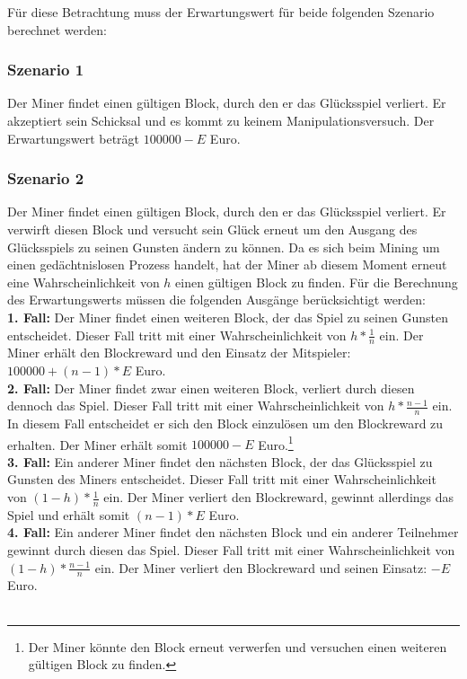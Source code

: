 Für diese Betrachtung muss der Erwartungswert für beide folgenden Szenario berechnet werden:

\subsubsection{Szenario 1} 
Der Miner findet einen gültigen Block, durch den er das Glücksspiel verliert. Er akzeptiert sein Schicksal und es kommt zu keinem Manipulationsversuch. Der Erwartungswert beträgt $100000 - E$ Euro.
\subsubsection{Szenario 2} 
Der Miner findet einen gültigen Block, durch den er das Glücksspiel verliert. Er verwirft diesen Block und versucht sein Glück erneut um den Ausgang des Glücksspiels zu seinen Gunsten ändern zu können. Da es sich beim Mining um einen gedächtnislosen Prozess handelt, hat der Miner ab diesem Moment erneut eine Wahrscheinlichkeit von $h$ einen gültigen Block zu finden. Für die Berechnung des Erwartungswerts müssen die folgenden Ausgänge berücksichtigt werden:\\
\textbf{1. Fall:} Der Miner findet einen weiteren Block, der das Spiel zu seinen Gunsten entscheidet. Dieser Fall tritt mit einer Wahrscheinlichkeit von $h*\frac{1}{n}$ ein. Der Miner erhält den Blockreward und den Einsatz der Mitspieler: $100000 + (n-1)*E$ Euro.\\
\textbf{2. Fall:} Der Miner findet zwar einen weiteren Block, verliert durch diesen dennoch das Spiel. Dieser Fall tritt mit einer Wahrscheinlichkeit von $h*\frac{n-1}{n}$ ein. In diesem Fall entscheidet er sich den Block einzulösen um den Blockreward zu erhalten. Der Miner erhält somit $100000 - E$ Euro.\footnote{Der Miner könnte den Block erneut verwerfen und versuchen einen weiteren gültigen Block zu finden.}\\
\textbf{3. Fall:} Ein anderer Miner findet den nächsten Block, der das Glücksspiel zu Gunsten des Miners entscheidet. Dieser Fall tritt mit einer Wahrscheinlichkeit von $(1-h)*\frac{1}{n}$ ein. Der Miner verliert den Blockreward, gewinnt allerdings das Spiel und erhält somit $(n-1)*E$ Euro.\\
\textbf{4. Fall:} Ein anderer Miner findet den nächsten Block und ein anderer Teilnehmer gewinnt durch diesen das Spiel. Dieser Fall tritt mit einer Wahrscheinlichkeit von $(1-h)*\frac{n-1}{n}$ ein. Der Miner verliert den Blockreward und seinen Einsatz: $-E$ Euro.\\\\
